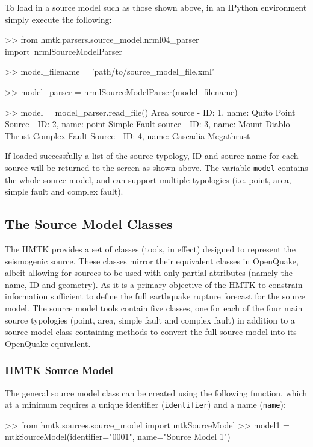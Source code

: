To load in a source model such as those shown above, in an IPython environment simply execute the following:

\begin{python}[frame=single]
>> from hmtk.parsers.source_model.nrml04_parser import\
    nrmlSourceModelParser

>> model_filename = 'path/to/source_model_file.xml'

>> model_parser = nrmlSourceModelParser(model_filename)

>> model = model_parser.read_file()
Area source - ID: 1, name: Quito
Point Source - ID: 2, name: point
Simple Fault source - ID: 3, name: Mount Diablo Thrust
Complex Fault Source - ID: 4, name: Cascadia Megathrust
\end{python}

If loaded successfully a list of the source typology, ID and source name for each source will be returned to the screen as shown above. The variable \verb=model= contains the whole source model, and can support multiple typologies (i.e. point, area, simple fault and complex fault).

\subsection{The Source Model Classes}

The HMTK provides a set of classes (tools, in effect) designed to represent the seismogenic source. These classes mirror their equivalent classes in OpenQuake, albeit allowing for sources to be used with only partial attributes (namely the name, ID and geometry). As it is a primary objective of the HMTK to constrain information sufficient to define the full earthquake rupture forecast for the source model. The source model tools contain five classes, one for each of the four main source typologies (point, area, simple fault and complex fault) in addition to a source model class containing methods to convert the full source model into its OpenQuake equivalent.

\subsubsection{HMTK Source Model}

The general source model class can be created using the following function, which at a minimum requires a unique identifier (\verb=identifier=) and a name (\verb=name=):

\begin{python}[frame=single]
>> from hmtk.sources.source_model import mtkSourceModel
>> model1 = mtkSourceModel(identifier="0001",
                           name="Source Model 1")
\end{python}


